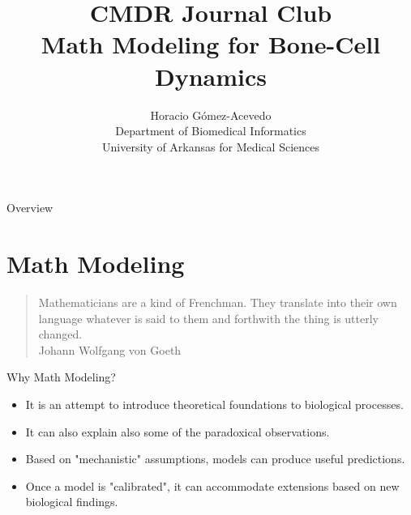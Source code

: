 \documentclass{beamer}
\title{CMDR Journal Club\\ Math Modeling for Bone-Cell Dynamics}
\author{Horacio G\'omez-Acevedo\\ Department of Biomedical Informatics\\
	University of Arkansas for Medical Sciences}
\begin{document}
	\begin{frame}[plain]
		\maketitle
	\end{frame}

\begin{frame}{Overview}
	\tableofcontents
\end{frame}

\section{Math Modeling}
\begin{frame}{}
	\begin{quote}
	Mathematicians are a kind of Frenchman. They translate into their own language whatever is said to them and forthwith the thing is utterly changed.\\
	Johann Wolfgang von Goeth
	\end{quote}
\end{frame}



\begin{frame}{Why Math Modeling?}

\begin{itemize}
	\item It is an attempt to introduce theoretical foundations to biological processes.
	\item It can also explain also some of the paradoxical observations.
	\item Based on "mechanistic" assumptions, models can produce useful predictions. 
	\item Once a model is "calibrated", it can accommodate extensions based on new biological findings. 
\end{itemize}	


\end{frame}
\end{document}
